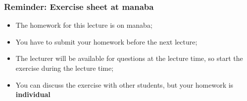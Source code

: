 \documentclass{beamer}
\begin{document}
\begin{frame}
  \frametitle{Reminder: Exercise sheet at manaba}

  \begin{itemize}
    \item The homework for this lecture is on manaba;
    \item You have to submit your homework before the next lecture;
    \item The lecturer will be available for questions at the lecture time, so start the exercise during the lecture time;
    \item You can discuss the exercise with other students, but your homework is {\bf individual}
  \end{itemize}
\end{frame}


\end{document}
